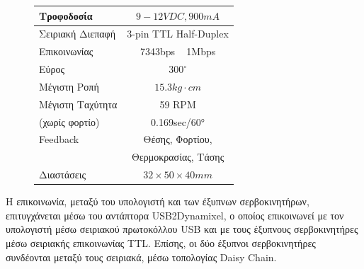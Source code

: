 \begin{figure}[!ht]
\begin{minipage}[b]{0.475\textwidth}
\begin{tabular}{| l | c |}
			Τροφοδοσία & $9-12VDC, 900mA$\\ \hline
			Σειριακή Διεπαφή& 3-pin TTL Half-Duplex\\
			Επικοινωνίας  & 7343bps ~ 1Mbps\\ \hline
			Εύρος & $300^{\circ}$\\ \hline
			Μέγιστη Ροπή & $15.3 kg \cdot cm$\\ \hline
			Μέγιστη Ταχύτητα & 59 RPM \\ (χωρίς φορτίο) & 0.169sec/60°\\ \hline
			Feedback & Θέσης, Φορτίου,\\& Θερμοκρασίας, Τάσης\\ \hline
			Διαστάσεις & $32 \times 50 \times 40 mm$\\ \hline
		\end{tabular}
		\label{tab:dxl_ax_12a_specs}
	\end{minipage}
\end{figure}


\bigskip
Η επικοινωνία, μεταξύ του υπολογιστή και των {έξυπνων σερβοκινητήρων}, επιτυγχάνεται μέσω του {αντάπτορα USB2Dynamixel}, ο οποίος επικοινωνεί με τον υπολογιστή μέσω σειριακού πρωτοκόλλου {USB} και με τους {έξυπνους σερβοκινητήρες} μέσω σειριακής επικοινωνίας {TTL}. Επίσης, οι δύο {έξυπνοι σερβοκινητήρες} συνδέονται μεταξύ τους σειριακά, μέσω τοπολογίας {Daisy Chain}.

